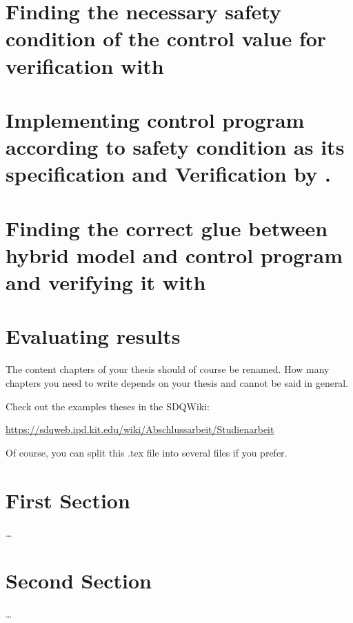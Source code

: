 \section{Finding the necessary safety condition of the control value for verification with \keym}
\label{sec:Process:SafetyCond}

\section{Implementing control program according to safety condition as its specification and Verification by \key.}
\label{sec:Process:Implementation}

\section{Finding the correct glue between hybrid model and control program and verifying it with \keym}
\label{sec:Process:Glue}

\section{Evaluating results}
\label{sec:Process:Eval}










\iffalse
The content chapters of your thesis should of course be renamed. How many
chapters you need to write depends on your thesis and cannot be said in general.

Check out the examples theses in the SDQWiki:

\url{https://sdqweb.ipd.kit.edu/wiki/Abschlussarbeit/Studienarbeit}

Of course, you can split this .tex file into several files if you prefer. 


\section{First Section}
\label{sec:FirstContent:FirstSection}

\dots

\section{Second Section}
\label{sec:FirstContent:SecondSection}

\dots


